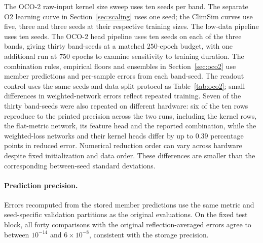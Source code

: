 The OCO-2 raw-input kernel size sweep uses ten seeds per band.
The separate O2 learning curve in Section~\ref{sec:scaling} uses one seed;
the ClimSim curves use five, three and three seeds at their respective
training sizes. The low-data pipeline uses ten seeds. The OCO-2 head
pipeline uses ten seeds on each of the three bands, giving thirty
band-seeds at a matched $250$-epoch budget, with one additional run at $750$
epochs to examine sensitivity to training duration. The combination rules, empirical floors and ensembles in
Section~\ref{sec:oco2} use member predictions and per-sample errors
from each band-seed. The readout control uses the same seeds and data-split protocol as
Table~\ref{tab:oco2}; small differences in weighted-network errors
reflect repeated training.
Seven of the thirty band-seeds were also repeated on different hardware:
six of the ten rows reproduce to the printed precision across the two runs,
including the kernel rows, the flat-metric network, its feature head and the
reported combination, while the weighted-loss networks
and their kernel heads differ by up to $0.39$ percentage points in reduced
error. Numerical reduction order can vary across hardware despite fixed
initialization and data order. These differences are smaller than the
corresponding between-seed standard deviations.

\paragraph{Prediction precision.} Errors recomputed from the stored member
predictions use the same metric and seed-specific validation partitions as
the original evaluations. On the fixed test block, all forty comparisons
with the original reflection-averaged errors agree to between $10^{-14}$
and $6\times10^{-8}$, consistent with the storage precision.

